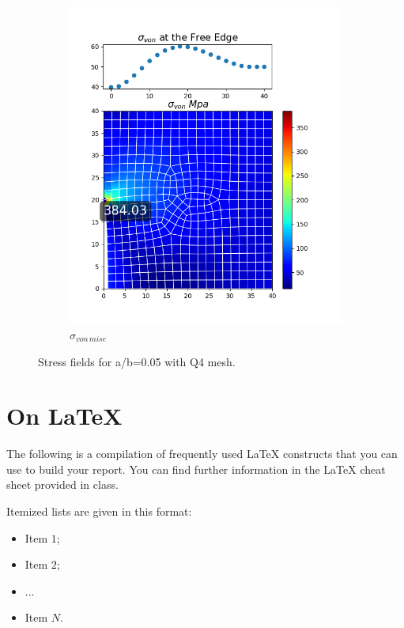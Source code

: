 \documentclass[twoside,twocolumn,10pt]{article}
\begin{document}
\begin{figure}[!ht]
\begin{subfigure}[c]{0.26\textwidth}
    \includegraphics[width=1.\linewidth]{Q2_5/Q5_0.05_von_quad.png}
    \caption{$\sigma_{von \, mise}$}
    \label{fig:von_quad_0.05}
  \end{subfigure}
  \caption{Stress fields for a/b=0.05 with Q4 mesh.}
  \label{fig:quad_0.05}
\end{figure}



\section{On \LaTeX{}}

The following is a compilation of frequently used \LaTeX{} constructs that you can use to build your report. You can find further information in the \LaTeX{} cheat sheet provided in class.

Itemized lists are given in this format:
\begin{itemize}
\item Item $1$;
\item Item $2$;
\item ...
\item Item $N$.
\end{itemize}
\end{document}
